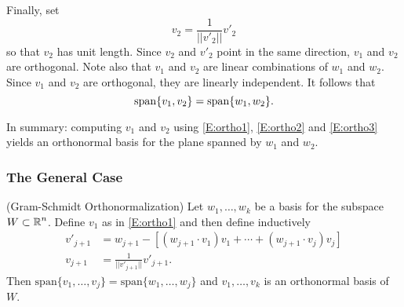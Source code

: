\documentclass{ximera}
\begin{document}
Finally, set
\begin{equation}  \label{E:ortho3}
v_2 = \frac{1}{||v'_2||}v'_2
\end{equation}
so that $v_2$ has unit length.  Since $v_2$ and $v'_2$ point in the
same direction, $v_1$ and $v_2$ are orthogonal.  Note also that $v_1$ and
$v_2$ are linear combinations of $w_1$ and $w_2$.  Since $v_1$ and $v_2$ are
orthogonal, they are linearly independent.  It follows that
\[
{\rm span}\{v_1,v_2\} = {\rm span}\{w_1,w_2\}.
\]

In summary: computing $v_1$ and $v_2$ using \eqref{E:ortho1}, \eqref{E:ortho2}
and \eqref{E:ortho3} yields an orthonormal basis for the
plane spanned by $w_1$ and $w_2$.

\subsubsection*{The General Case}

\begin{theorem} (Gram-Schmidt Orthonormalization) \label{T:orthobasis}
Let $w_1,\ldots,w_k$ be a basis for the subspace $W\subset\mbox{$\mathbb{R}$}^n$.  Define
$v_1$ as in \eqref{E:ortho1} and then define inductively
\begin{align}
  v'_{j+1} & =  w_{j+1} -[(w_{j+1}\cdot v_1)v_1+ \cdots  +(w_{j+1}\cdot v_j)v_j] \label{E:inductiveGS} \\
v_{j+1} & =  \frac{1}{||v'_{j+1}||}v'_{j+1}. \label{eq:gsnormal}
\end{align}
Then $\mathrm{span}\{v_1,\ldots,v_j\}=\mathrm{span}\{w_1,\ldots,w_j\}$ 
and $v_1,\ldots,v_k$ is an orthonormal basis of $W$. 
\end{theorem}
\end{document}
